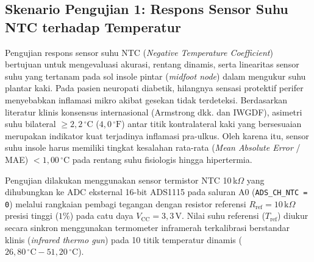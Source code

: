 \subsection{Skenario Pengujian 1: Respons Sensor Suhu NTC terhadap Temperatur}
\label{subsec:Skenario1}

Pengujian respons sensor suhu NTC (\textit{Negative Temperature Coefficient}) bertujuan untuk mengevaluasi akurasi, rentang dinamis, serta linearitas sensor suhu yang tertanam pada sol insole pintar (\textit{midfoot node}) dalam mengukur suhu plantar kaki. Pada pasien neuropati diabetik, hilangnya sensasi protektif perifer menyebabkan inflamasi mikro akibat gesekan tidak terdeteksi. Berdasarkan literatur klinis konsensus internasional (Armstrong dkk. dan IWGDF), asimetri suhu bilateral $\ge 2{,}2\,^\circ\mathrm{C}$ ($4{,}0\,^\circ\mathrm{F}$) antar titik kontralateral kaki yang bersesuaian merupakan indikator kuat terjadinya inflamasi pra-ulkus. Oleh karena itu, sensor suhu insole harus memiliki tingkat kesalahan rata-rata (\textit{Mean Absolute Error} / MAE) $< 1{,}00\,^\circ\mathrm{C}$ pada rentang suhu fisiologis hingga hipertermia.

Pengujian dilakukan menggunakan sensor termistor NTC 10\,k$\Omega$ yang dihubungkan ke ADC eksternal 16-bit ADS1115 pada saluran A0 (\texttt{ADS\_CH\_NTC = 0}) melalui rangkaian pembagi tegangan dengan resistor referensi $R_{\mathrm{ref}} = 10\,\mathrm{k}\Omega$ presisi tinggi ($1\%$) pada catu daya $V_{\mathrm{CC}} = 3{,}3\,\mathrm{V}$. Nilai suhu referensi ($T_{\mathrm{ref}}$) diukur secara sinkron menggunakan termometer inframerah terkalibrasi berstandar klinis (\textit{infrared thermo gun}) pada 10 titik temperatur dinamis ($26{,}80\,^\circ\mathrm{C} - 51{,}20\,^\circ\mathrm{C}$).

